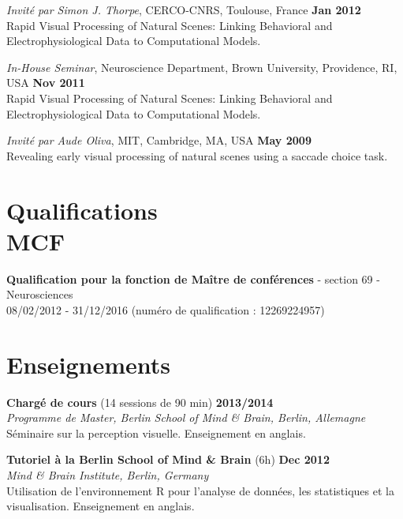 \documentclass[margin,line]{resume}
\begin{document}
\begin{resume}
	\vspace{-2mm} 
	\textit{Invité par Simon J. Thorpe}, CERCO-CNRS, Toulouse, France \hfill \textbf{Jan 2012}\\
	Rapid Visual Processing of Natural Scenes: Linking Behavioral and Electrophysiological Data to Computational Models.

	\vspace{-2mm} 
	\textit{In-House Seminar}, Neuroscience Department, Brown University, Providence, RI, USA \hfill \textbf{Nov 2011}\\
	Rapid Visual Processing of Natural Scenes: Linking Behavioral and Electrophysiological Data to Computational Models.

	\vspace{-2mm} 
	\textit{Invité par Aude Oliva}, MIT, Cambridge, MA, USA \hfill \textbf{May 2009}\\
	Revealing early visual processing of natural scenes using a saccade choice task.

	\normalsize

\vspace{3mm}
\section{\mysidestyle Qualifications\\MCF}
    \textbf{Qualification pour la fonction de Maître de conférences} - section 69 - Neurosciences\\
    08/02/2012 - 31/12/2016 (numéro de qualification : 12269224957)
    
    
\vspace{3mm}
\section{\mysidestyle Enseignements}
	
	\textbf{Chargé de cours} (14 sessions de 90 min) \hfill \textbf{2013/2014}\\
	\textsl{Programme de Master, Berlin School of Mind \& Brain, Berlin, Allemagne}\\
	Séminaire sur la perception visuelle. Enseignement en anglais.
	
	\vspace{-2mm}
	\textbf{Tutoriel à la Berlin School of Mind \& Brain} (6h) \hfill \textbf{Dec 2012}\\
	\textsl{Mind \& Brain Institute, Berlin, Germany}\\
	Utilisation de l'environnement R pour l'analyse de données, les statistiques et la visualisation.  Enseignement en anglais.


\end{resume}
\end{document}
